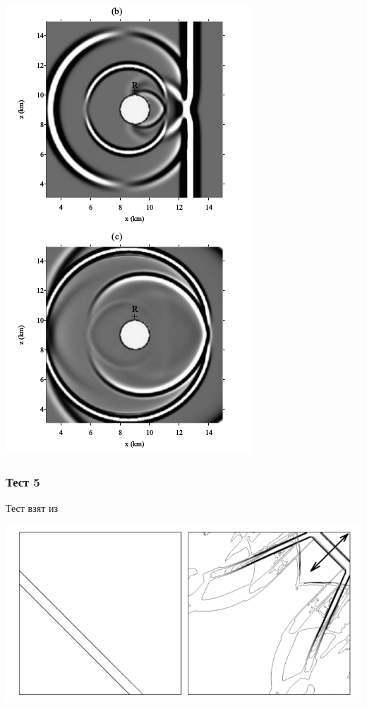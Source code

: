 \documentclass{article}
\begin{document}
\includegraphics[scale=0.6]{2D_seismic_tests/cavity.png}

\newpage
\subsubsection{Тест 5} 

Тест взят из \cite{chel}

\includegraphics[scale=0.5]{2D_seismic_tests/5.png}
\end{document}
